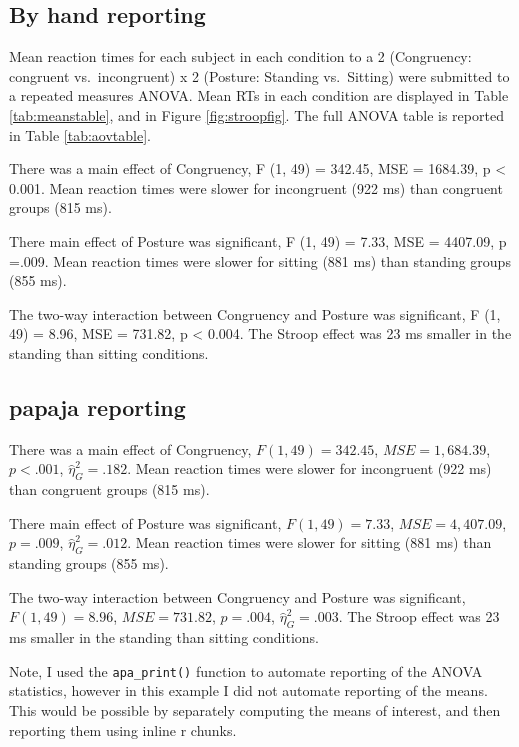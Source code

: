 \documentclass[
  english,
  man]{apa6}
\begin{document}
\hypertarget{by-hand-reporting}{%
\subsection{By hand reporting}\label{by-hand-reporting}}

Mean reaction times for each subject in each condition to a 2 (Congruency: congruent vs.~incongruent) x 2 (Posture: Standing vs.~Sitting) were submitted to a repeated measures ANOVA. Mean RTs in each condition are displayed in Table \ref{tab:meanstable}, and in Figure \ref{fig:stroopfig}. The full ANOVA table is reported in Table \ref{tab:aovtable}.

There was a main effect of Congruency, F (1, 49) = 342.45, MSE = 1684.39, p \textless{} 0.001. Mean reaction times were slower for incongruent (922 ms) than congruent groups (815 ms).

There main effect of Posture was significant, F (1, 49) = 7.33, MSE = 4407.09, p =.009. Mean reaction times were slower for sitting (881 ms) than standing groups (855 ms).

The two-way interaction between Congruency and Posture was significant, F (1, 49) = 8.96, MSE = 731.82, p \textless{} 0.004. The Stroop effect was 23 ms smaller in the standing than sitting conditions.

\hypertarget{papaja-reporting}{%
\subsection{papaja reporting}\label{papaja-reporting}}

There was a main effect of Congruency, \(F(1, 49) = 342.45\), \(\mathit{MSE} = 1,684.39\), \(p < .001\), \(\hat{\eta}^2_G = .182\). Mean reaction times were slower for incongruent (922 ms) than congruent groups (815 ms).

There main effect of Posture was significant, \(F(1, 49) = 7.33\), \(\mathit{MSE} = 4,407.09\), \(p = .009\), \(\hat{\eta}^2_G = .012\). Mean reaction times were slower for sitting (881 ms) than standing groups (855 ms).

The two-way interaction between Congruency and Posture was significant, \(F(1, 49) = 8.96\), \(\mathit{MSE} = 731.82\), \(p = .004\), \(\hat{\eta}^2_G = .003\). The Stroop effect was 23 ms smaller in the standing than sitting conditions.

Note, I used the \texttt{apa\_print()} function to automate reporting of the ANOVA statistics, however in this example I did not automate reporting of the means. This would be possible by separately computing the means of interest, and then reporting them using inline r chunks.
\end{document}
